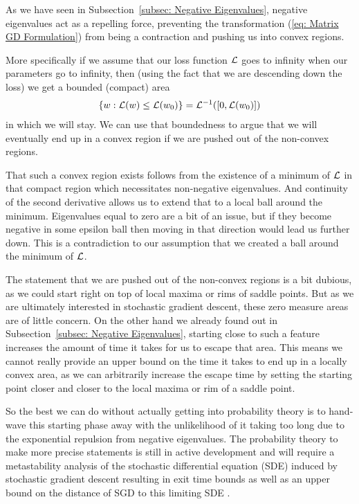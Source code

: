 As we have seen in Subsection~\ref{subsec: Negative Eigenvalues}, negative
eigenvalues act as a repelling force, preventing the transformation (\ref{eq:
Matrix GD Formulation}) from being a contraction and pushing us into convex
regions.

More specifically if we assume that our loss function \(\mathcal{L}\) goes to infinity when
our parameters go to infinity, then (using the fact that we are descending down
the loss) we get a bounded (compact) area 
%
\begin{align*}
	\{w : \mathcal{L}(w) \le \mathcal{L}(w_0)\} = \mathcal{L}^{-1}([0, \mathcal{L}(w_0)])
\end{align*}
%
in which we will stay. We can use that boundedness to argue that we will
eventually end up in a convex region if we are pushed out of the non-convex
regions.

That such a convex region exists follows from the existence of a minimum of
\(\mathcal{L}\) in that compact region which necessitates non-negative
eigenvalues. And continuity of the second derivative allows us to extend that to 
a local ball around the minimum. Eigenvalues equal to zero
are a bit of an issue, but if they become negative in some epsilon ball
then moving in that direction would lead us further down. This is a contradiction
to our assumption that we created a ball around the minimum of \(\mathcal{L}\).

The statement that we are pushed out of the non-convex regions is a bit
dubious, as we could start right on top of local maxima or rims of saddle points.
But as we are ultimately interested in stochastic gradient descent, these zero
measure areas are of little concern. On the other hand we already found out in
Subsection~\ref{subsec: Negative Eigenvalues}, starting close to such a feature
increases the amount of time it takes for us to escape that area. This means
we cannot really provide an upper bound on the time it takes to end up in
a locally convex area, as we can arbitrarily increase the escape time by
setting the starting point closer and closer to the local maxima or rim of a
saddle point.

So the best we can do without actually getting into probability theory is to
hand-wave this starting phase away with the unlikelihood of it taking too long
due to the exponential repulsion from negative eigenvalues. The probability
theory to make more precise statements is still in active development and will
require a metastability analysis of the stochastic differential equation (SDE)
induced by stochastic gradient descent
\parencite[e.g.][]{bovierMetastabilityPotentialTheoreticApproach2015,nguyenFirstExitTime2019}
resulting in exit time bounds as well as an upper bound on the distance of SGD
to this limiting SDE
\parencite[e.g.][]{liStochasticModifiedEquations2017,ankirchnerApproximatingStochasticGradient2021}.


